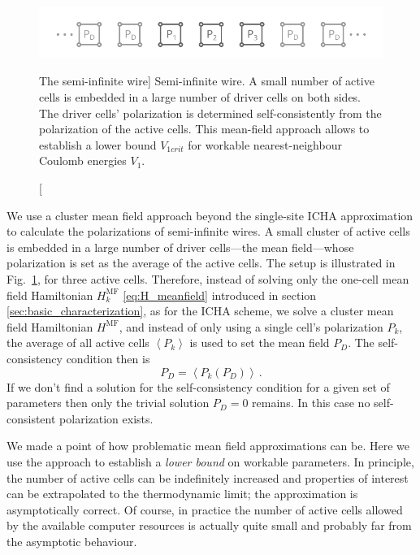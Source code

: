 \begin{figure}
  \center
  \includegraphics{semi_infinite_wire}
  \caption
  [The semi-infinite wire]
  {
  Semi-infinite wire. A small number of active cells is embedded in a large
  number of driver cells on both sides. The driver cells' polarization is
  determined self-consistently from the polarization of the active cells. This
  mean-field approach allows to establish a lower bound $V_{1crit}$ for workable
  nearest-neighbour Coulomb energies $V_1$.
  }
  \label{fig:semi_infinite_wire}
\end{figure}

We use a cluster mean field approach beyond the single-site ICHA approximation
to calculate the polarizations of semi-infinite wires. A small cluster of active
cells is embedded in a large number of driver cells---the mean field---whose
polarization is set as the average of the active cells. The setup is illustrated
in Fig.~\ref{fig:semi_infinite_wire}, for three active cells. Therefore, instead
of solving only the one-cell mean field Hamiltonian $H^{\mathrm{MF}}_k$
\eqref{eq:H_meanfield} introduced in section \ref{sec:basic_characterization},
as for the ICHA scheme, we solve a cluster mean field Hamiltonian
$H^{\mathrm{MF}}$, and instead of only using a single cell's polarization $P_k$,
the average of all active cells $\left< P_k \right>$ is used to set the mean
field $P_D$. The self-consistency condition then is
%
\begin{equation}
  P_D = \left< P_k \left( P_D \right) \right> \, .
\end{equation}
%
If we don't find a solution for the self-consistency condition for a given set
of parameters then only the trivial solution $P_D = 0$ remains. In this case no
self-consistent polarization exists.

We made a point of how problematic mean field approximations can be. Here we use
the approach to establish a \emph{lower bound} on workable parameters. In
principle, the number of active cells can be indefinitely increased and
properties of interest can be extrapolated to the thermodynamic limit; the
approximation is asymptotically correct. Of course, in practice the number of
active cells allowed by the available computer resources is actually quite small
and probably far from the asymptotic behaviour.


